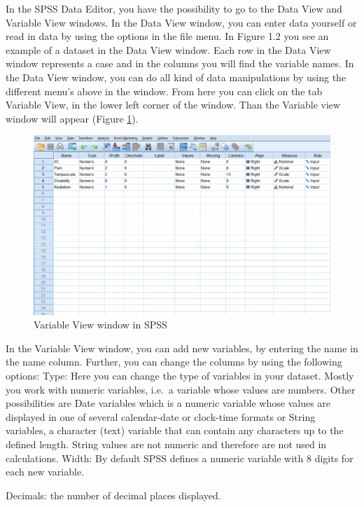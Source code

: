 \documentclass[]{book}
\theoremstyle{definition}
\theoremstyle{definition}
\theoremstyle{definition}
\theoremstyle{remark}
\begin{document}
In the SPSS Data Editor, you have the possibility to go to the Data View
and Variable View windows. In the Data View window, you can enter data
yourself or read in data by using the options in the file menu. In
Figure 1.2 you see an example of a dataset in the Data View window. Each
row in the Data View window represents a case and in the columns you
will find the variable names. In the Data View window, you can do all
kind of data manipulations by using the different menu's above in the
window. From here you can click on the tab Variable View, in the lower
left corner of the window. Than the Variable view window will appear
(Figure \ref{fig:fig3}).

\begin{figure}

{\centering \includegraphics[width=0.9\linewidth]{images/fig1.3} 

}

\caption{Variable View window in SPSS}\label{fig:fig3}
\end{figure}

In the Variable View window, you can add new variables, by entering the
name in the name column. Further, you can change the columns by using
the following options: Type: Here you can change the type of variables
in your dataset. Mostly you work with numeric variables, i.e.~a variable
whose values are numbers. Other possibilities are Date variables which
is a numeric variable whose values are displayed in one of several
calendar-date or clock-time formats or String variables, a character
(text) variable that can contain any characters up to the defined
length. String values are not numeric and therefore are not used in
calculations. Width: By default SPSS defines a numeric variable with 8
digits for each new variable.

Decimals: the number of decimal places displayed.
\end{document}
